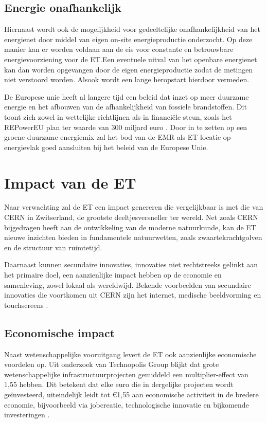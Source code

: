 \subsection{Energie onafhankelijk}
Hiernaast wordt ook de mogelijkheid voor gedeeltelijke onafhankelijkheid van het energienet door middel van eigen on-site energieproductie onderzocht. Op deze manier kan er worden voldaan aan de eis voor constante en betrouwbare energievoorziening voor de ET.\@ Een eventuele uitval van het openbare energienet kan dan worden opgevangen door de eigen energieproductie zodat de metingen niet verstoord worden. Alsook wordt een lange heropstart hierdoor vermeden.\medskip

De Europese unie heeft al langere tijd een beleid dat inzet op meer duurzame energie en het afbouwen van de afhankelijkheid van fossiele brandstoffen. Dit toont zich zowel in wettelijke richtlijnen \autocite{TFEU194} als in financiële steun, zoals het REPowerEU plan ter waarde van 300 miljard euro \autocite{EuropeanCommission2022}. Door in te zetten op een groene duurzame energiemix zal het bod van de EMR als ET-locatie op energievlak goed aansluiten bij het beleid van de Europese Unie.

\section{Impact van de ET}
Naar verwachting zal de ET een impact genereren die vergelijkbaar is met die van CERN in Zwitserland, de grootste deeltjesversneller ter wereld. Net zoals CERN bijgedragen heeft aan de ontwikkeling van de moderne natuurkunde, kan de ET nieuwe inzichten bieden in fundamentele natuurwetten, zoals zwaartekrachtgolven en de structuur van ruimtetijd.\medskip

Daarnaast kunnen secundaire innovaties, innovaties niet rechtstreeks gelinkt aan het primaire doel, een aanzienlijke impact hebben op de economie en samenleving, zowel lokaal als wereldwijd. Bekende voorbeelden van secundaire innovaties die voortkomen uit CERN zijn het internet, medische beeldvorming en touch\-screens \autocite{Telescope2026}\autocite{CERN1973}.

\subsection{Economische impact}
Naast wetenschappelijke vooruitgang levert de ET ook aanzienlijke economische voordelen op. Uit onderzoek van Technopolis Group blijkt dat grote wetenschappelijke infrastructuurprojecten gemiddeld een multiplier-effect van 1,55 hebben. Dit betekent dat elke euro die in dergelijke projecten wordt geïnvesteerd, uiteindelijk leidt tot €1,55 aan economische activiteit in de bredere economie, bijvoorbeeld via jobcreatie, technologische innovatie en bijkomende investeringen \autocite{TechnopolisGroup2018}.


